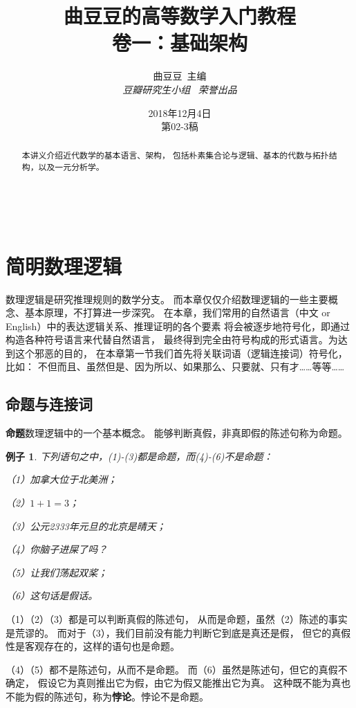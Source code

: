 \documentclass[a4paper, 11pt]{article} %
\title{\textbf{曲豆豆的高等数学入门教程}\\$\,$\\%
卷一：基础架构} %
\author{\textsc{曲豆豆\,\,\,主编} %
\\{\textit{豆瓣研究生小组\,\,\,\,\,荣誉出品}}} %
\date{2018年12月4日\\
第02-3稿} %
\makeatletter
\newcommand*{\vsp}{\vspace{10pt}}
\newtheorem{example}{例子}[subsection]
\renewcommand{\maketitle}{ %
\begin{center} %
{\Huge\@title} %

\vspace{30pt} %

{\Large\@author} %
\\\@date %

\vspace{20pt} %
\end{center}
}
\makeatother
\begin{document}
\maketitle


\begin{abstract}
本讲义介绍近代数学的基本语言、架构，
包括朴素集合论与逻辑、基本的代数与拓扑结构，以及一元分析学。
\end{abstract}

\tableofcontents
\newpage

\newpage

\section{简明数理逻辑}

数理逻辑是研究推理规则的数学分支。
而本章仅仅介绍数理逻辑的一些主要概念、基本原理，不打算进一步深究。
在本章，我们常用的自然语言（中文 or English）中的表达逻辑关系、推理证明的各个要素
将会被逐步地符号化，即通过构造各种符号语言来代替自然语言，
最终得到完全由符号构成的形式语言。为达到这个邪恶的目的，
在本章第一节我们首先将关联词语（逻辑连接词）符号化，比如：
不但而且、虽然但是、因为所以、如果那么、只要就、只有才……等等……

\subsection{命题与连接词}
\textbf{命题}数理逻辑中的一个基本概念。
能够判断真假，非真即假的陈述句称为命题。

\begin{example}下列语句之中，(1)-(3)都是命题，而(4)-(6)不是命题：

（1）加拿大位于北美洲；

（2）$1+1=3$；

（3）公元2333年元旦的北京是晴天；

（4）你脑子进屎了吗？

（5）让我们荡起双桨；

（6）这句话是假话。\label{examples of propositions}
\end{example}

（1）（2）（3）都是可以判断真假的陈述句，
从而是命题，虽然（2）陈述的事实是荒谬的。
而对于（3），我们目前没有能力判断它到底是真还是假，
但它的真假性是客观存在的，这样的语句也是命题。

（4）（5）都不是陈述句，从而不是命题。
而（6）虽然是陈述句，但它的真假不确定，
假设它为真则推出它为假，由它为假又能推出它为真。
这种既不能为真也不能为假的陈述句，称为\textbf{悖论}。悖论不是命题。\vsp
\end{document}
